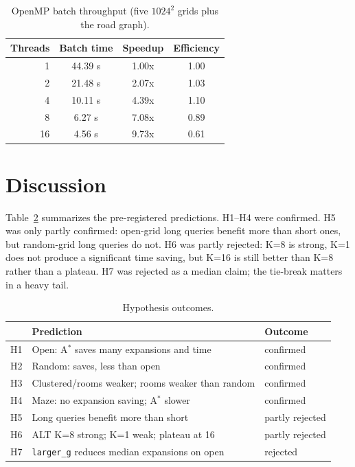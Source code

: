 \documentclass[conference,10pt]{IEEEtran}
\newcommand{\Astar}{A$^\ast$}
\newcommand{\code}[1]{\texttt{#1}}
\begin{document}
\begin{table}[!t]
\centering
\caption{OpenMP batch throughput (five $1024^2$ grids plus the road graph).}
\label{tab:omp}
\footnotesize
\setlength{\tabcolsep}{3pt}
\begin{tabular}{rccc}
\toprule
Threads & Batch time & Speedup & Efficiency\\
\midrule
1 & 44.39 s & 1.00x & 1.00\\
2 & 21.48 s & 2.07x & 1.03\\
4 & 10.11 s & 4.39x & 1.10\\
8 & 6.27 s & 7.08x & 0.89\\
16 & 4.56 s & 9.73x & 0.61\\
\bottomrule
\end{tabular}
\end{table}

\section{Discussion}
\label{sec:discussion}

Table~\ref{tab:hyp} summarizes the pre-registered predictions.  H1--H4 were
confirmed.  H5 was only partly confirmed: open-grid long queries benefit more
than short ones, but random-grid long queries do not.  H6 was partly rejected:
K=8 is strong, K=1 does not produce a significant time saving, but K=16 is
still better than K=8 rather than a plateau.  H7 was rejected as a median
claim; the tie-break matters in a heavy tail.

\begin{table}[!t]
\centering
\caption{Hypothesis outcomes.}
\label{tab:hyp}
\footnotesize
\setlength{\tabcolsep}{3pt}
\begin{tabular}{p{0.6cm}p{5.5cm}p{1.5cm}}
\toprule
 & Prediction & Outcome\\
\midrule
H1 & Open: \Astar{} saves many expansions and time & confirmed\\
H2 & Random: saves, less than open & confirmed\\
H3 & Clustered/rooms weaker; rooms weaker than random & confirmed\\
H4 & Maze: no expansion saving; \Astar{} slower & confirmed\\
H5 & Long queries benefit more than short & partly rejected\\
H6 & ALT K=8 strong; K=1 weak; plateau at 16 & partly rejected\\
H7 & \code{larger\_g} reduces median expansions on open & rejected\\
\bottomrule
\end{tabular}
\end{table}
\end{document}
